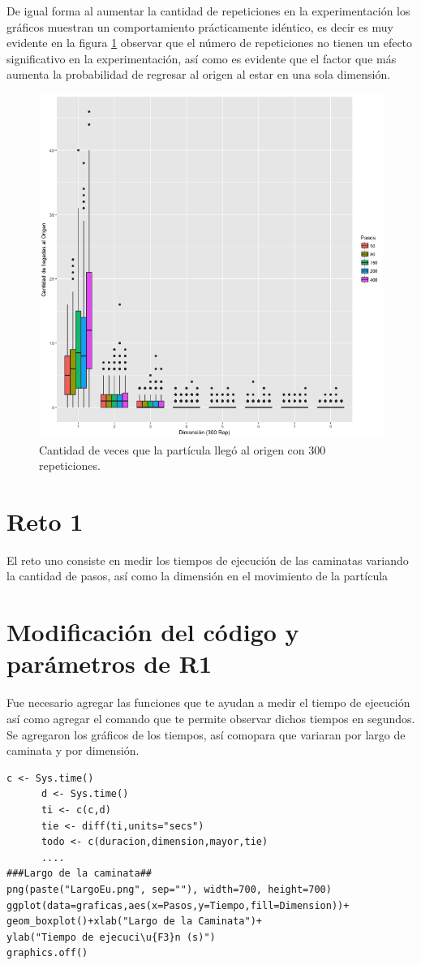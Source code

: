 \documentclass[a4paper]{article}
\begin{document}
De igual forma al aumentar la cantidad de repeticiones en la experimentación los gráficos muestran un comportamiento prácticamente idéntico, es decir es muy evidente en la figura \ref{fig:PorcentajesEu300} observar que el número de repeticiones no tienen un efecto significativo en la experimentación, así como es evidente que el factor que más aumenta la probabilidad de regresar al origen al estar en una sola dimensión.
\begin{figure}
\centering
\includegraphics[width=0.7\linewidth]{PorcentajesEu300}
\caption{Cantidad de veces que la partícula llegó al origen con 300 repeticiones.}
\label{fig:PorcentajesEu300}
\end{figure}

\section{Reto 1}
El reto uno consiste en medir los tiempos de ejecución de las caminatas variando la cantidad de pasos, así como la dimensión en el movimiento de la partícula

\section{Modificación del código y parámetros de R1}
Fue necesario agregar las funciones que te ayudan a medir el tiempo de ejecución así como agregar el comando que te permite observar dichos tiempos en segundos. Se agregaron los gráficos de los tiempos, así comopara que variaran por largo de caminata y por dimensión.
\begin{lstlisting}[frame=single]
     c <- Sys.time()
      d <- Sys.time()
      ti <- c(c,d)
      tie <- diff(ti,units="secs")
      todo <- c(duracion,dimension,mayor,tie)
      ....
###Largo de la caminata##
png(paste("LargoEu.png", sep=""), width=700, height=700)
ggplot(data=graficas,aes(x=Pasos,y=Tiempo,fill=Dimension))+
geom_boxplot()+xlab("Largo de la Caminata")+
ylab("Tiempo de ejecuci\u{F3}n (s)")
graphics.off()
\end{lstlisting}
\end{document}
